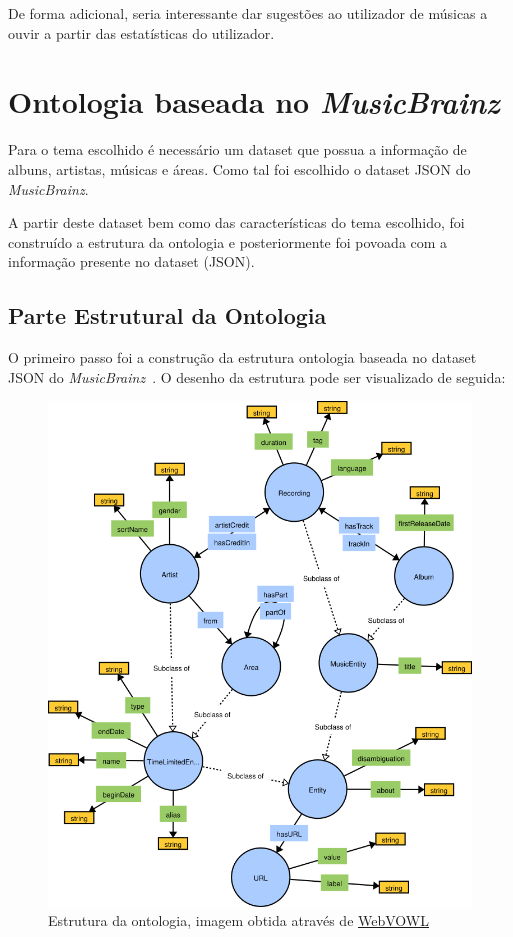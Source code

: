 \documentclass{article}
\begin{document}
De forma adicional, seria interessante dar sugestões ao utilizador de músicas a ouvir a partir das estatísticas do utilizador.

\section{Ontologia baseada no \textit{MusicBrainz}} \label{ontologia}

Para o tema escolhido é necessário um dataset que possua a informação de albuns, artistas, músicas e áreas. Como tal foi escolhido o dataset JSON do \textit{MusicBrainz}.

A partir deste dataset bem como das características do tema escolhido, foi construído a estrutura da ontologia e posteriormente foi povoada com a informação presente no dataset (JSON).

\subsection{Parte Estrutural da Ontologia}

O primeiro passo foi a construção da estrutura ontologia baseada no dataset JSON do \textit{MusicBrainz}~\cite{mbSchema}. O desenho da estrutura pode ser visualizado de seguida:

\begin{figure}[H]
    \centering
    \includegraphics[width=15cm]{Pictures/ontologySctructure.png}
    \caption{Estrutura da ontologia, imagem obtida através de \protect\href{http://www.visualdataweb.de/webvowl/}{WebVOWL}}
\end{figure}
\end{document}
